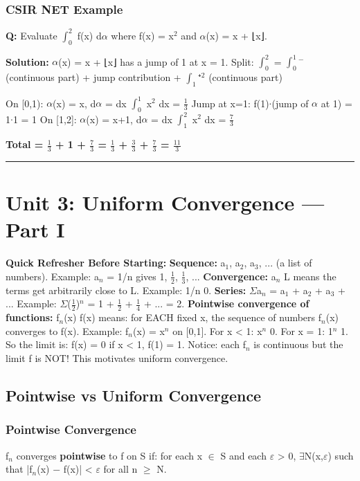 \documentclass[12pt,a4paper,openany]{book}
\begin{document}
{{\subsubsection{ CSIR NET Example}
\textbf{Q:} Evaluate $\int_0^2$ f(x) d$\alpha$ where f(x) = x$^2$ and $\alpha$(x) = x + ⌊x⌋.

\textbf{Solution:} $\alpha$(x) = x + ⌊x⌋ has a jump of 1 at x = 1.
Split: $\int_0^2$ = $\int_0^1^{-}$ (continuous part) + jump contribution + $\int_1$⁺$^2$ (continuous part)

On [0,1): $\alpha$(x) = x, d$\alpha$ = dx  $\int_0^1$ x$^2$ dx = $\frac{1}{3}$
Jump at x=1: f(1)$\cdot$(jump of $\alpha$ at 1) = 1$\cdot$1 = 1
On [1,2]: $\alpha$(x) = x+1, d$\alpha$ = dx  $\int_1^2$ x$^2$ dx = $\frac{7}{3}$

\textbf{Total = $\frac{1}{3}$ + 1 + $\frac{7}{3}$ = $\frac{1}{3}$ + $\frac{3}{3}$ + $\frac{7}{3}$ = $\frac{11}{3}$}

\bigskip\noindent\rule{\textwidth}{0.4pt}\bigskip

\section{Unit 3: Uniform Convergence — Part I}

\begin{prereqbox}
 \textbf{Quick Refresher Before Starting:}
\textbf{Sequence:} a$_1$, a$_2$, a$_3$, ... (a list of numbers). Example: a$_n$ = 1/n gives 1, $\frac{1}{2}$, $\frac{1}{3}$, ...
\textbf{Convergence:} a$_n$  L means the terms get arbitrarily close to L. Example: 1/n  0.
\textbf{Series:} $\Sigma$a$_n$ = a$_1$ + a$_2$ + a$_3$ + ... Example: $\Sigma$($\frac{1}{2}$)$^n$ = 1 + $\frac{1}{2}$ + $\frac{1}{4}$ + ... = 2.
\textbf{Pointwise convergence of functions:} f$_n$(x)  f(x) means: for EACH fixed x, the sequence of numbers f$_n$(x) converges to f(x).
Example: f$_n$(x) = x$^n$ on [0,1]. For x < 1: x$^n$  0. For x = 1: 1$^n$  1. So the limit is: f(x) = 0 if x < 1, f(1) = 1.
Notice: each f$_n$ is continuous but the limit f is NOT! This motivates uniform convergence.
\end{prereqbox}


\subsection{Pointwise vs Uniform Convergence}

\subsubsection{Pointwise Convergence}
{f$_n$} converges \textbf{pointwise} to f on S if: for each x $\in$ S and each $\varepsilon$ > 0, $\exists$N(x,$\varepsilon$) such that |f$_n$(x) − f(x)| < $\varepsilon$ for all n $\geq$ N.

}}
\end{document}
